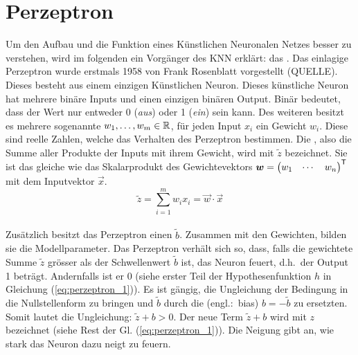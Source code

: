 \section{Perzeptron}
Um den Aufbau und die Funktion eines Künstlichen Neuronalen Netzes besser zu
verstehen, wird im folgenden ein Vorgänger des KNN erklärt: das .
\para{}
Das einlagige Perzeptron wurde erstmals 1958 von Frank Rosenblatt vorgestellt (QUELLE). Dieses
besteht aus einem einzigen Künstlichen Neuron. Dieses künstliche Neuron
hat mehrere binäre Inputs und einen einzigen binären Output. Binär
bedeutet, dass der Wert nur entweder 0 (\textit{aus}) oder 1 (\textit{ein}) sein
kann. Des weiteren besitzt es mehrere sogenannte  $w_1, \ldots,
w_m \in \mathbb{R}$, für jeden Input $x_i$ ein Gewicht $w_i$.
Diese sind reelle Zahlen, welche das Verhalten des Perzeptron bestimmen.
Die , also die Summe aller Produkte der Inputs mit
ihrem Gewicht, wird mit $\tilde{z}$ bezeichnet.
Sie ist das gleiche wie das Skalarprodukt des Gewichtevektors
$\bm{w} = \begin{pmatrix} w_1 & \cdots & w_n \end{pmatrix}^{\mathsf{T}}$ mit dem
Inputvektor $\vec{x}$. \\
\begin{equation*}
  \tilde{z} = \sum_{i=1}^{m} w_i x_i = \vec{w} \cdot \vec{x}
\end{equation*} \\
Zusätzlich besitzt das Perzeptron einen  $\tilde{b}$.
Zusammen mit den Gewichten, bilden sie die Modellparameter.
Das Perzeptron verhält sich so, dass, falls die gewichtete Summe $\tilde{z}$ grösser als der
Schwellenwert $\tilde{b}$ ist, das Neuron feuert, d.h.\ der Output 1 beträgt.
Andernfalls ist er 0 (siehe erster Teil der Hypothesenfunktion $h$ in Gleichung (\ref{eq:perzeptron_1})).
Es ist gängig, die Ungleichung der Bedingung in die Nullstellenform zu bringen
und $\tilde{b}$ durch die  (engl.:\ bias)
$b = -\tilde{b}$ zu ersetzten. Somit lautet die Ungleichung: $\tilde{z} + b
> 0$. Der neue Term $\tilde{z} + b$ wird mit $z$ bezeichnet (siehe Rest der Gl. (\ref{eq:perzeptron_1})).
Die Neigung gibt an, wie stark das Neuron dazu neigt zu feuern.\\

